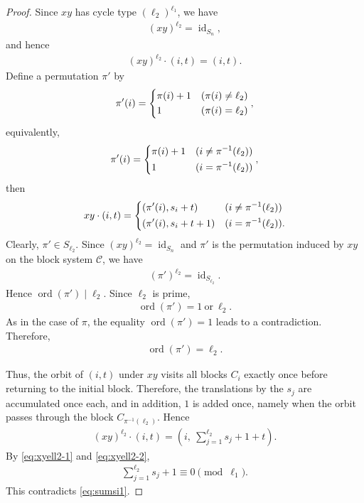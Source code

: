 \documentclass[12pt,reqno]{amsart}
\newcommand{\mcC}{\mathcal{C}}
\DeclareMathOperator{\id}{id}								%
\DeclareMathOperator{\ord}{ord}							%
\theoremstyle{mythmstyle}
\theoremstyle{mydefstyle}
\numberwithin{equation}{section}
\begin{document}
\begin{proof}
Since $xy$ has cycle type $(\ell_{2})^{\ell_{1}}$, we have
\begin{align}
(xy)^{\ell_{2}} = \id_{S_{n}},
\end{align}
and hence
\begin{align}
\label{eq:xyell2-1}
(xy)^{\ell_{2}}\cdot(i, t) = (i, t).
\end{align}
Define a permutation $\pi'$ by
\begin{align}
\pi'(i) =
\begin{dcases}
\pi(i) + 1 & (\pi(i) \ne \ell_{2}) \\
1 & (\pi(i) = \ell_{2})
\end{dcases},
\end{align}
equivalently,
\begin{align}
\pi'(i) =
\begin{dcases}
\pi(i) + 1 & (i \ne \pi^{-1}(\ell_{2})) \\
1 & (i = \pi^{-1}(\ell_{2}))
\end{dcases},
\end{align}
then
\begin{align}
xy\cdot (i, t) =
\begin{dcases}
(\pi'(i), s_{i}+t) & (i \ne \pi^{-1}(\ell_{2})) \\
(\pi'(i), s_{i}+t+1) & (i = \pi^{-1}(\ell_{2})).
\end{dcases}
\end{align}
Clearly, $\pi' \in S_{\ell_2}$.
Since $(xy)^{\ell_2}=\id_{S_n}$ and $\pi'$ is the permutation induced by
$xy$ on the block system $\mcC$, we have
\begin{align}
(\pi')^{\ell_2}=\id_{S_{\ell_2}}.
\end{align}
Hence $\ord(\pi')\mid\ell_2$.
Since $\ell_2$ is prime,
\begin{align}
\ord(\pi')=1\ \text{or}\ \ell_{2}.
\end{align}
As in the case of $\pi$, the equality $\ord(\pi')=1$ leads to a contradiction.
Therefore,
\begin{align}
\ord(\pi')=\ell_2.
\end{align}

Thus, the orbit of $(i,t)$ under $xy$ visits all blocks $C_i$
exactly once before returning to the initial block.
Therefore, the translations by the $s_{j}$ are accumulated once each, and
in addition, $1$ is added once, namely when the orbit passes through
the block $C_{\pi^{-1}(\ell_2)}$. Hence
\begin{align}
\label{eq:xyell2-2}
(xy)^{\ell_{2}}\cdot(i, t) = \left(i,\ \sum_{j=1}^{\ell_{2}}s_{j} + 1 + t\right).
\end{align}
By \eqref{eq:xyell2-1} and \eqref{eq:xyell2-2},
\begin{align}
\label{eq:sumsi2}
\sum_{j=1}^{\ell_{2}}s_{j} + 1 \equiv 0 \pmod{\ell_{1}}.
\end{align}
This contradicts \eqref{eq:sumsi1}.


\end{proof}
\end{document}
